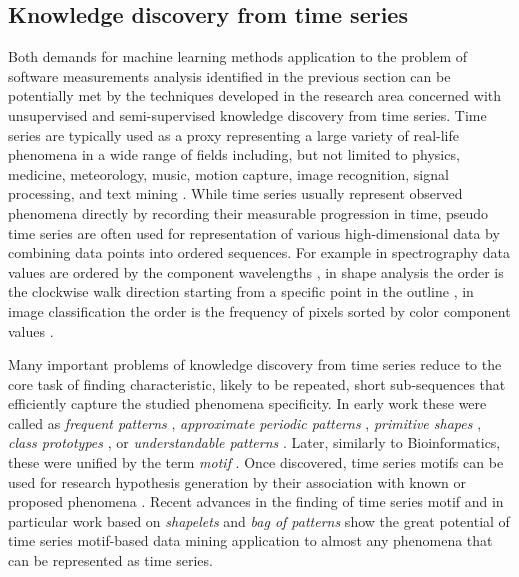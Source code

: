 %
%
\subsection{Knowledge discovery from time series}\label{section_timeseries_kdd}
Both demands for machine learning methods application to the problem of software measurements analysis
identified in the previous section can be potentially met by the techniques developed in the research 
area concerned with unsupervised and semi-supervised knowledge discovery from time series.
Time series are typically used as a proxy representing a large variety of real-life 
phenomena in a wide range of fields including, but not limited to physics, medicine, meteorology, music, 
motion capture, image recognition, signal processing, and text mining \cite{citeulike:11796594}. 
While time series usually represent observed phenomena directly by recording their measurable 
progression in time, pseudo time series are often used for representation of various high-dimensional 
data by combining data points into ordered sequences. 
For example in spectrography data values are ordered by the component wavelengths \cite{citeulike:12550833},
in shape analysis the order is the clockwise walk direction starting from a specific point in the outline 
\cite{citeulike:12550835}, in image classification the order is the frequency of pixels sorted by color component 
values \cite{citeulike:2900542}.

Many important problems of knowledge discovery from time series reduce to the core task of finding 
characteristic, likely to be repeated, short sub-sequences that efficiently capture the studied 
phenomena specificity. In early work these were called as 
\textit{frequent patterns} \cite{citeulike:5159615}, 
\textit{approximate periodic patterns} \cite{citeulike:1959582},
\textit{primitive shapes} \cite{citeulike:5898869}, 
\textit{class prototypes} \cite{citeulike:4406444}, 
or \textit{understandable patterns} \cite{citeulike:3978076}. 
Later, similarly to Bioinformatics, these were unified by the term \textit{motif} \cite{citeulike:3977965}.
Once discovered, time series motifs can be used for research hypothesis generation by their association 
with known or proposed phenomena \cite{citeulike:3977965}. 
Recent advances in the finding of time series motif and in particular work based on \textit{shapelets} 
\cite{citeulike:7344347} \cite{citeulike:11957982} \cite{citeulike:12552293} and \textit{bag of patterns} 
\cite{citeulike:10525778} show the great potential of time series motif-based data mining application
to almost any phenomena that can be represented as time series.

